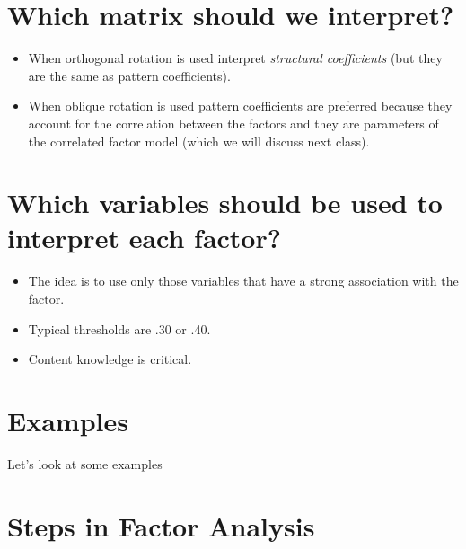 \documentclass[
]{book}
\providecommand{\tightlist}{%
  \setlength{\itemsep}{0pt}\setlength{\parskip}{0pt}}
\begin{document}
\hypertarget{which-matrix-should-we-interpret}{%
\section{Which matrix should we interpret?}\label{which-matrix-should-we-interpret}}

\begin{itemize}
\item
  When orthogonal rotation is used interpret \emph{structural coefficients} (but they are the same as pattern coefficients).
\item
  When oblique rotation is used pattern coefficients are preferred because they account for the correlation between the factors and they are parameters of the correlated factor model (which we will discuss next class).
\end{itemize}

\hypertarget{which-variables-should-be-used-to-interpret-each-factor}{%
\section{Which variables should be used to interpret each factor?}\label{which-variables-should-be-used-to-interpret-each-factor}}

\begin{itemize}
\tightlist
\item
  The idea is to use only those variables that have a strong association with the factor.
\item
  Typical thresholds are \textbar.30\textbar{} or \textbar.40\textbar.
\item
  Content knowledge is critical.
\end{itemize}

\hypertarget{examples}{%
\section{Examples}\label{examples}}

Let's look at some examples

\hypertarget{steps-in-factor-analysis}{%
\section{Steps in Factor Analysis}\label{steps-in-factor-analysis}}
\end{document}
